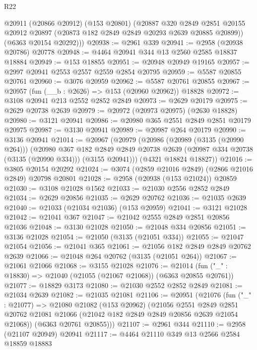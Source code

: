 \begin{lexlean}{R22}
\begin{coremodule}
      @20911
        (@20866 @20912)
        (@153 @20801)
        (@20887
          @320
          @2849
          @2851
          @20155
          @20912
          @20897
          (@20873 @182 @2849 @2849 @20293 @2639 @20885 @20899))
        (@6363 @20154 @20292)))
@20938 := @2961 @339
@20941 := @2958 (@20938 @20786) @20778
@20948 := @4464 @20941 @344 @13 @2560 @2585 @18837 @18884
@20949 := @153 @18855
@20951 := @20948 @20949 @19165
@20957 := @2997 @20941 @2553 @2557 @2559 @2854 @20795
@20959 := @5587 @20855 @20761
@20960 := @3076 @20959
@20962 := @5587 @20761 @20855
@20967 := @20957 (fun (__b : @2626) => @153 (@20960 @20962)) @18828
@20972 := @3108 @20941 @213 @2552 @2852 @2849
@20973 := @2629 @20179
@20975 := @2629 @20738 @2639
@20979 := @20972 (@20973 @20975) (@2630 @18828)
@20980 := @3121 @20941
@20986 := @20980 @365 @2551 @2849 @2851 @20179 @20975
@20987 := @3130 @20941
@20989 := @20987 @264 @20179
@20990 := @3136 @20941
@21014 := @20967
    (@20979
      (@20986
        (@20989 (@3135 (@20990 @264)))
        (@20980
          @367
          @182
          @2849
          @2849
          @20738
          @2639
          (@20987 @334 @20738 (@3135 (@20990 @334)))
          (@3155 @20941)))
      (@4321 @18824 @18827))
@21016 := @3805 @20154 @20292
@21024 := @3074 (@2859 @21016 @2849) (@2866 @21016 @2849) @20798 @20801
@21028 := @2958 (@20938 (@153 @21024)) @20859
@21030 := @3108 @21028 @1562
@21033 := @21030 @2556 @2852 @2849
@21034 := @2629 @20856
@21035 := @2629 @20762
@21036 := @21035 @2639
@21040 := @21033 (@21034 @21036) (@153 @20959)
@21041 := @3121 @21028
@21042 := @21041 @367
@21047 := @21042 @2555 @2849 @2851 @20856 @21036
@21048 := @3130 @21028
@21050 := @21048 @334 @20856
@21051 := @3136 @21028
@21054 := @21050 (@3135 (@21051 @334))
@21055 := @21047 @21054
@21056 := @21041 @365
@21061 := @21056 @182 @2849 @2849 @20762 @2639
@21066 := @21048 @264 @20762 (@3135 (@21051 @264))
@21067 := @21061 @21066
@21068 := @3155 @21028
@21076 := @21014 (fun ("_" : @18830) => @21040 (@21055 (@21067 @21068)) (@6363 @20855 @20761))
@21077 := @18829 @3173
@21080 := @21030 @2552 @2852 @2849
@21081 := @21034 @2639
@21082 := @21035 @21081
@21106 := @20951
    (@21076
      (fun ("_" : @21077) =>
      @21080
        @21082
        (@153 @20962)
        (@21056
          @2551
          @2849
          @2851
          @20762
          @21081
          @21066
          (@21042 @182 @2849 @2849 @20856 @2639 @21054 @21068))
        (@6363 @20761 @20855)))
@21107 := @2961 @344
@21110 := @2958 (@21107 @20949) @20941
@21117 := @4464 @21110 @349 @13 @2566 @2584 @18859 @18883

\end{coremodule}
\end{lexlean}
